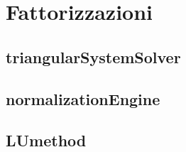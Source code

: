\section{Fattorizzazioni}
\subsection{triangularSystemSolver}


\subsection{normalizationEngine}


\subsection{LUmethod}
\label{subsection:LUmethod}



